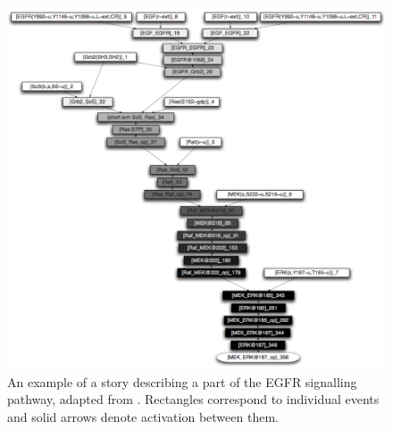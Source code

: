\begin{figure}[!h]
  \vskip -0.1cm
  \begin{center}
    \includegraphics[scale=0.35]{figures/story-egfr.png}
  \end{center}
  \vskip -0.1cm
  \caption{An example of a story describing a part of the EGFR
    signalling pathway, adapted from
    \protect\cite{DanosEtAl-CONCUR07}. Rectangles correspond to
    individual events and solid arrows denote activation between
    them. }
  \label{fig:story-egfr}
\end{figure}
